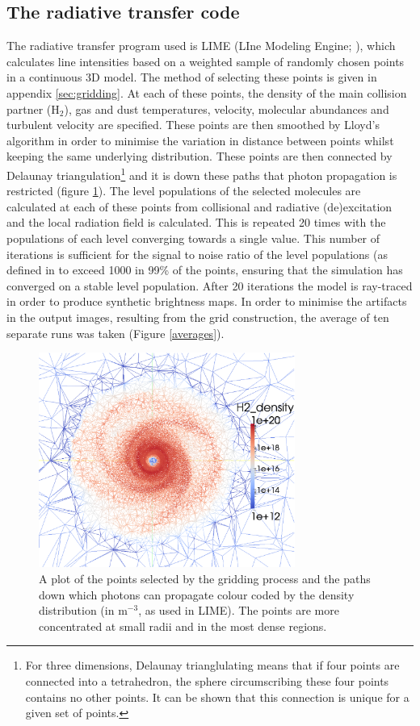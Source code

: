 \documentclass[useAMS,usenatbib]{mn2e}
\begin{document}
\subsection{The radiative transfer code} \label{subsec:radiative_transfer_code}
The radiative transfer program used is LIME (LIne Modeling Engine; \cite{Brinch2010}), which  calculates line intensities based on a weighted sample of randomly chosen points in a continuous 3D model. The method of selecting these points is given in appendix  \ref{sec:gridding}. At each of these points, the density of the main collision partner (H$_2$), gas and dust temperatures, velocity, molecular abundances and turbulent velocity are specified. These points are then smoothed by Lloyd's algorithm \citep{Lloyd1982} in order to minimise the variation in distance between points whilst keeping the same underlying distribution. These points are then connected by Delaunay triangulation\footnote{For three dimensions, Delaunay trianglulating means that if four points are connected into a tetrahedron, the sphere circumscribing these four points contains no other points. It can be shown that this connection is unique for a given set of points.} and it is down these paths that photon propagation is restricted (figure \ref{grid}). The level populations of the selected molecules are calculated at each of these points from collisional and radiative (de)excitation and the local radiation field is calculated. This is repeated 20 times with the populations of each level converging towards a single value. This number of iterations is sufficient for the signal to noise ratio of the level populations (as defined in \cite{Brinch2010} to exceed 1000 in 99\% of the points, ensuring that the simulation has converged on a stable level population. After 20 iterations the model is ray-traced in order to produce synthetic brightness maps. In order to minimise the artifacts in the output images, resulting from the grid construction, the average of ten separate runs was taken (Figure \ref{averages}).


\begin{figure}
 \includegraphics[width=84mm]{Figures/model/lime2.eps}%
 \caption{A plot of the points selected by the gridding process and the paths down which photons can propagate colour coded by the density distribution (in m$^{-3}$, as used in LIME). The points are more concentrated at small radii and in the most dense regions.}
 \label{grid}
\end{figure}
\end{document}
